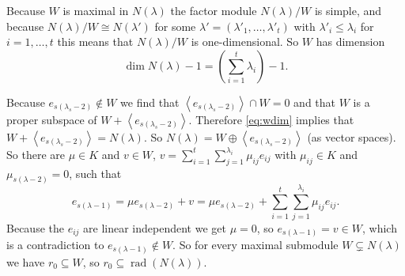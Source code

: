 \documentclass[a4paper,10pt]{article}
\theoremstyle{definition}
\newcommand{\rad}{\operatorname{rad}}
\newcommand{\gen}[1]{\left\langle#1\right\rangle}
\begin{document}
Because $W$ is maximal in $N(\lambda)$ the factor module $N(\lambda)/W$ is simple, and because $N(\lambda)/W \cong N(\lambda')$ for some $\lambda' = (\lambda'_1, \ldots, \lambda'_t)$ with $\lambda'_i \leq \lambda_i$ for $i=1,\ldots,t$ this means that $N(\lambda)/W$ is one-dimensional. So $W$ has dimension
\begin{equation}\label{eq:wdim}
 \dim N(\lambda)-1 = \left(\sum_{i=1}^t \lambda_i\right)-1.
\end{equation}

Because $e_{s(\lambda_s-2)} \not \in W$ we find that $\gen{e_{s(\lambda_s-2)}} \cap W = 0$ and that $W$ is a proper subspace of $W + \gen{e_{s(\lambda_s-2)}}$. Therefore \eqref{eq:wdim} implies that $W + \gen{e_{s(\lambda_s-2)}} = N(\lambda)$. So $N(\lambda) = W \oplus \gen{e_{s(\lambda_s-2)}}$ (as vector spaces). So there are $\mu \in K$ and $v \in W$, $v = \sum_{i=1}^t \sum_{j=1}^{\lambda_i} \mu_{ij} e_{ij}$ with $\mu_{ij} \in K$ and $\mu_{s (\lambda-2)} = 0$, such that
\[
 e_{s (\lambda-1)} = \mu e_{s (\lambda-2)} + v = \mu e_{s (\lambda-2)} + \sum_{i=1}^t \sum_{j=1}^{\lambda_i} \mu_{ij} e_{ij}.
\]
Because the $e_{ij}$ are linear independent we get $\mu = 0$, so $e_{s (\lambda-1)} = v \in W$, which is a contradiction to $e_{s (\lambda-1)} \not \in W$. So for every maximal submodule $W \subsetneq N(\lambda)$ we have $r_0 \subseteq W$, so $r_0 \subseteq \rad(N(\lambda))$.





\section{}
\end{document}
